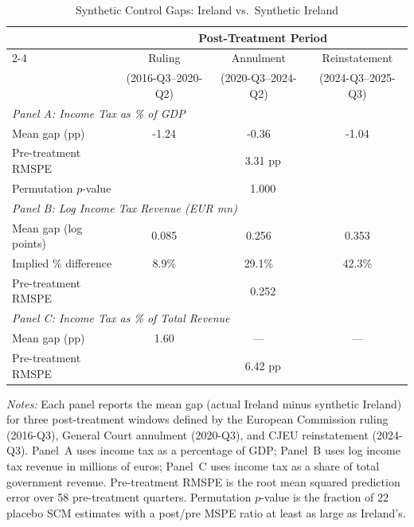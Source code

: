 \begin{table}[H]
\centering
\caption{Synthetic Control Gaps: Ireland vs.~Synthetic Ireland}
\label{tab:main}
\begin{threeparttable}
\begin{tabular}{lccc}
\toprule
 & \multicolumn{3}{c}{Post-Treatment Period} \\
\cmidrule(lr){2-4}
 & Ruling & Annulment & Reinstatement \\
 & (2016-Q3--2020-Q2) & (2020-Q3--2024-Q2) & (2024-Q3--2025-Q3) \\
\midrule
\multicolumn{4}{l}{\textit{Panel A: Income Tax as \% of GDP}} \\
    Mean gap (pp) & -1.24 & -0.36 & -1.04 \\
    Pre-treatment RMSPE & \multicolumn{3}{c}{3.31 pp} \\
    Permutation $p$-value & \multicolumn{3}{c}{1.000} \\
\midrule
\multicolumn{4}{l}{\textit{Panel B: Log Income Tax Revenue (EUR mn)}} \\
    Mean gap (log points) & 0.085 & 0.256 & 0.353 \\
    Implied \% difference & 8.9\% & 29.1\% & 42.3\% \\
    Pre-treatment RMSPE & \multicolumn{3}{c}{0.252} \\
\midrule
\multicolumn{4}{l}{\textit{Panel C: Income Tax as \% of Total Revenue}} \\
    Mean gap (pp) & 1.60 & --- & --- \\
    Pre-treatment RMSPE & \multicolumn{3}{c}{6.42 pp} \\
\bottomrule
\end{tabular}
\begin{tablenotes}[flushleft]
\small
\item \textit{Notes:} Each panel reports the mean gap (actual Ireland minus synthetic Ireland) for three post-treatment windows defined by the European Commission ruling (2016-Q3), General Court annulment (2020-Q3), and CJEU reinstatement (2024-Q3). Panel~A uses income tax as a percentage of GDP; Panel~B uses log income tax revenue in millions of euros; Panel~C uses income tax as a share of total government revenue. Pre-treatment RMSPE is the root mean squared prediction error over 58 pre-treatment quarters. Permutation $p$-value is the fraction of 22 placebo SCM estimates with a post/pre MSPE ratio at least as large as Ireland's.
\end{tablenotes}
\end{threeparttable}
\end{table}
